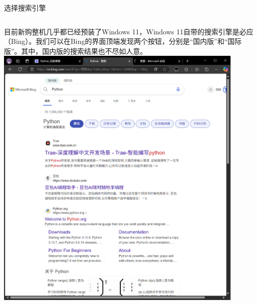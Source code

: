 \documentclass{beamer}
\begin{document}
\begin{frame}{选择搜索引擎}
    \begin{columns}[T]
            目前新购整机几乎都已经预装了Windows 11，Windows 11自带的搜索引擎是必应（Bing）。我们可以在Bing的界面顶端发现两个按钮，分别是“国内版”和“国际版”。其中，国内版的搜索结果也不尽如人意。
            \includegraphics[width=0.9\textwidth]{4-2-BingN.png}
    \end{columns}
\end{frame}
\end{document}

